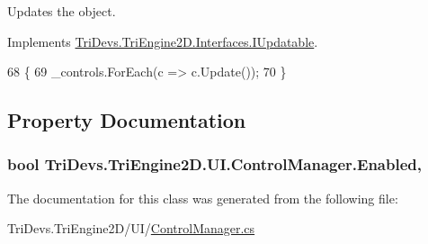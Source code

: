 Updates the object. 



Implements \hyperlink{interface_tri_devs_1_1_tri_engine2_d_1_1_interfaces_1_1_i_updatable_a01e54ce26f078bffd4434aca86e2a7e4}{Tri\-Devs.\-Tri\-Engine2\-D.\-Interfaces.\-I\-Updatable}.


\begin{DoxyCode}
68         \{
69             \_controls.ForEach(c => c.Update());
70         \}
\end{DoxyCode}


\subsection{Property Documentation}
\hypertarget{class_tri_devs_1_1_tri_engine2_d_1_1_u_i_1_1_control_manager_ad08d8151078d6c27c5191963996159d5}{
\subsubsection[{Enabled}]{\setlength{\rightskip}{0pt plus 5cm}bool Tri\-Devs.\-Tri\-Engine2\-D.\-U\-I.\-Control\-Manager.\-Enabled\hspace{0.3cm}{\ttfamily [get]}, {\ttfamily [set]}}}\label{class_tri_devs_1_1_tri_engine2_d_1_1_u_i_1_1_control_manager_ad08d8151078d6c27c5191963996159d5}


The documentation for this class was generated from the following file\-:\begin{DoxyCompactItemize}
\item 
Tri\-Devs.\-Tri\-Engine2\-D/\-U\-I/\hyperlink{_control_manager_8cs}{Control\-Manager.\-cs}\end{DoxyCompactItemize}
